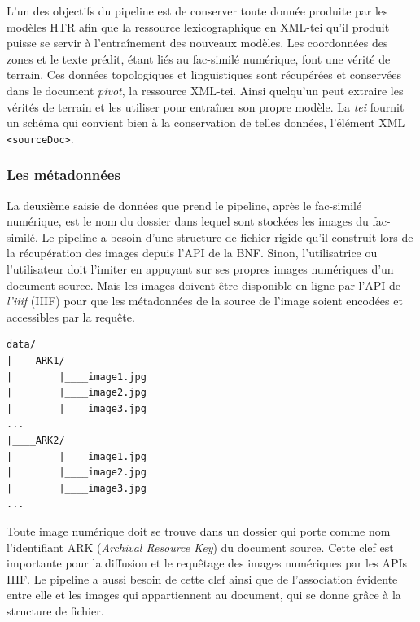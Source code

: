 \documentclass[class=article, crop=false]{standalone}
\begin{document}
L'un des objectifs du pipeline est de conserver toute donnée produite par les modèles \acrshort{HTR} afin que la ressource lexicographique en XML-\acrshort{tei} qu'il produit puisse se servir à l'entraînement des nouveaux modèles. Les coordonnées des zones et le texte prédit, étant liés au fac-similé numérique, font une vérité de terrain. Ces données topologiques et linguistiques sont récupérées et conservées dans le document \textit{pivot}, la ressource XML-\acrshort{tei}. Ainsi quelqu'un peut extraire les vérités de terrain et les utiliser pour entraîner son propre modèle. La \textit{\acrlong{tei}} fournit un schéma qui convient bien à la conservation de telles données, l'élément XML \texttt{<sourceDoc>}.

\subsubsection{Les métadonnées}
La deuxième saisie de données que prend le pipeline, après le fac-similé numérique, est le nom du dossier dans lequel sont stockées les images du fac-similé. Le pipeline a besoin d'une structure de fichier rigide qu'il construit lors de la récupération des images depuis l'API de la \acrshort{BNF}. Sinon, l'utilisatrice ou l'utilisateur doit l'imiter en appuyant sur ses propres images numériques d'un document source. Mais les images doivent être disponible en ligne par l'API de \textit{l'\Gls{iiif}} (\acrshort{IIIF}) pour que les métadonnées de la source de l'image soient encodées et accessibles par la requête.

\begin{center}
\begin{verbatim}
data/
|____ARK1/
|        |____image1.jpg
|        |____image2.jpg
|        |____image3.jpg
...
|____ARK2/
|        |____image1.jpg
|        |____image2.jpg
|        |____image3.jpg
...
\end{verbatim}
\end{center}

\noindent Toute image numérique doit se trouve dans un dossier qui porte comme nom l'identifiant ARK (\textit{Archival Resource Key}) du document source. Cette clef est importante pour la diffusion et le requêtage des images numériques par les APIs \acrshort{IIIF}. Le pipeline a aussi besoin de cette clef ainsi que de l'association évidente entre elle et les images qui appartiennent au document, qui se donne grâce à la structure de fichier.
\end{document}
